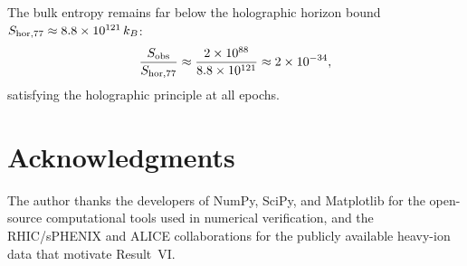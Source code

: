 \documentclass[12pt,a4paper]{article}
\theoremstyle{plain}
\theoremstyle{definition}
\theoremstyle{remark}
\begin{document}
The bulk entropy remains far below the holographic horizon bound
$S_{\rm hor, 77} \approx 8.8 \times 10^{121}\,k_B$:
\begin{equation}
  \frac{S_{\rm obs}}{S_{\rm hor, 77}} \approx
  \frac{2 \times 10^{88}}{8.8 \times 10^{121}} \approx 2 \times 10^{-34},
\end{equation}
satisfying the holographic principle at all epochs.


\section*{Acknowledgments}

The author thanks the developers of NumPy, SciPy, and
Matplotlib for the open-source computational tools used in
numerical verification, and the RHIC/sPHENIX and ALICE
collaborations for the publicly available heavy-ion data that
motivate Result~VI.
\end{document}

